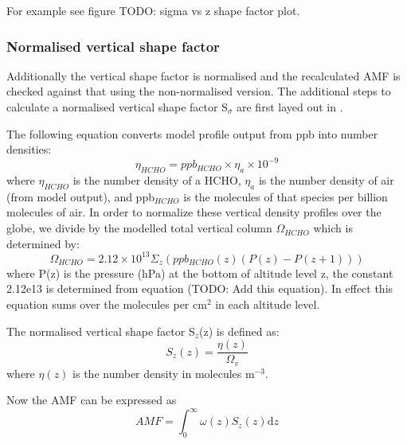     For example see figure TODO: sigma vs z shape factor plot.
    
    \subsubsection{Normalised vertical shape factor}
      \label{Model:omiRecalc:normalising_shapefactor}
    
      Additionally the vertical shape factor is normalised and the recalculated AMF is checked against that using the non-normalised version.
      The additional steps to calculate a normalised vertical shape factor S$_\sigma$ are first layed out in \textcite{Palmer2001}.
      
      The following equation converts model profile output from ppb into number densities:
      \begin{equation} \label{Model:omiRecalc:eqn_ppb_to_n}
      \eta_{HCHO} = ppb_{HCHO} \times \eta_a \times 10^{-9}
      \end{equation}
      where $\eta_{HCHO}$ is the number density of a HCHO, $\eta_a$ is the number density of air (from model output), and ppb$_{HCHO}$ is the molecules of that species per billion molecules of air.
      In order to normalize these vertical density profiles over the globe, we divide by the modelled total vertical column $\Omega_{HCHO}$ which is determined by:
      \begin{equation*}
      \Omega_{HCHO} = 2.12\times 10^{13} \Sigma_z \left( ppb_{HCHO}(z) (P(z)-P(z+1)) \right)
      \end{equation*}
      where P(z) is the pressure (hPa) at the bottom of altitude level z, the constant 2.12e13 is determined from equation (TODO: Add this equation).
      In effect this equation sums over the molecules per cm$^2$ in each altitude level.
      
      The normalised vertical shape factor S$_z$(z) is defined as:
      \begin{equation} \label{Model:omiRecalc:eqn_ShapeFactor}
      S_z(z) = \frac{\eta(z)}{\Omega_v}
      \end{equation}
      where $\eta(z)$ is the number density in molecules m$^{-3}$.
      
      Now the AMF can be expressed as
      \begin{equation} \label{Model:omiRecalc:eqn_AMFintwSdz}
      AMF = \int_0^\infty \omega(z) S_z(z) \mathrm{d}z
      \end{equation}
      
